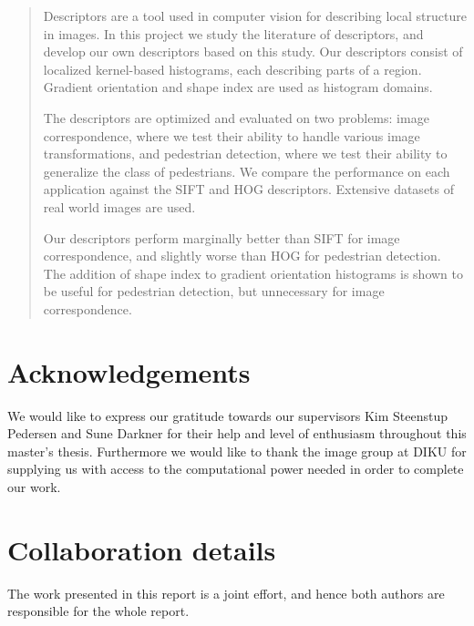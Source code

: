 \documentclass[thesis.tex]{subfiles}
\begin{document}
\begin{abstract}

Descriptors are a tool used in computer vision for describing local structure in images. In this project we study the literature of descriptors, and develop our own descriptors based on this study. Our descriptors consist of localized kernel-based histograms, each describing parts of a region. Gradient orientation and shape index are used as histogram domains.

The descriptors are optimized and evaluated on two problems: image correspondence, where we test their ability to handle various image transformations, and pedestrian detection, where we test their ability to generalize the class of pedestrians. We compare the performance on each application against the SIFT and HOG descriptors. Extensive datasets of real world images are used.

Our descriptors perform marginally better than SIFT for image correspondence, and slightly worse than HOG for pedestrian detection. The addition of shape index to gradient orientation histograms is shown to be useful for pedestrian detection, but unnecessary for image correspondence.

\end{abstract}

\section*{Acknowledgements}
We would like to express our gratitude towards our supervisors Kim Steenstup Pedersen and Sune Darkner for their help and level of enthusiasm throughout this master's thesis. Furthermore we would like to thank the image group at DIKU for supplying us with access to the computational power needed in order to complete our work.

\section*{Collaboration details}
The work presented in this report is a joint effort, and hence both authors are responsible for the whole report.

\subbibliography
\end{document}
